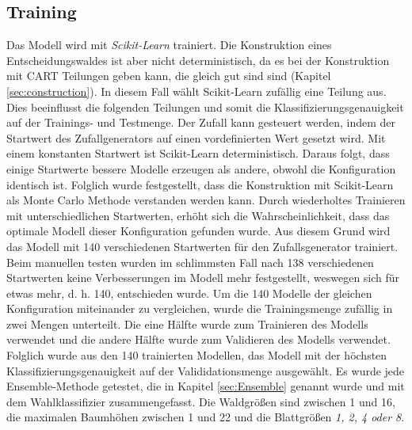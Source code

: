 \subsection{Training}
\label{sec:Training}
Das Modell wird mit \textit{Scikit-Learn} trainiert. Die Konstruktion eines Entscheidungswaldes ist aber nicht deterministisch, da es bei der Konstruktion mit CART Teilungen geben kann, die gleich gut sind
sind (Kapitel \ref{sec:construction}). In diesem Fall wählt Scikit-Learn zufällig eine Teilung aus. Dies beeinflusst die folgenden Teilungen und somit die Klassifizierungsgenauigkeit auf der
Trainings- und Testmenge. Der Zufall kann gesteuert werden, indem der Startwert des Zufallgenerators auf einen vordefinierten Wert gesetzt wird. Mit einem konstanten Startwert ist Scikit-Learn deterministisch.
\newline
\newline
Daraus folgt, dass einige Startwerte bessere Modelle erzeugen als andere, obwohl die Konfiguration identisch ist. Folglich wurde festgestellt, dass die Konstruktion mit Scikit-Learn als Monte Carlo Methode verstanden
werden kann. Durch wiederholtes Trainieren mit unterschiedlichen Startwerten, erhöht sich die Wahrscheinlichkeit, dass das optimale Modell dieser Konfiguration gefunden wurde. Aus diesem Grund wird das
Modell mit 140 verschiedenen Startwerten für den Zufallsgenerator trainiert. Beim manuellen testen wurden im schlimmsten Fall nach 138 verschiedenen Startwerten keine Verbesserungen im Modell mehr festgestellt,
weswegen sich für etwas mehr, d. h. 140, entschieden wurde.
\newline
\newline
Um die 140 Modelle der gleichen Konfiguration miteinander zu vergleichen, wurde die Trainingsmenge zufällig in zwei Mengen unterteilt. Die eine Hälfte wurde zum Trainieren des Modells verwendet und die andere
Hälfte wurde zum Validieren des Modells verwendet. Folglich wurde aus den 140 trainierten Modellen, das Modell mit der höchsten Klassifizierungsgenauigkeit auf der Valididationsmenge ausgewählt.
\newline
\newline
Es wurde jede Ensemble-Methode getestet, die in Kapitel \ref{sec:Ensemble} genannt wurde und mit dem Wahlklassifizier zusammengefasst. Die Waldgrößen sind zwischen 1 und 16, die maximalen Baumhöhen zwischen
1 und 22 und die Blattgrößen \textit{1, 2, 4 oder 8}.

